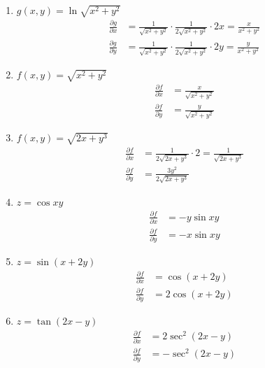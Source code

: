 \begin{enumerate}
    \item $g(x, y)=\ln \sqrt{x^2+y^2}$
          \sol{}
          \begin{align*}
              \frac{\partial g}{\partial x} & = \frac{1}{\sqrt{x^2+y^2}} \cdot \frac{1}{2\sqrt{x^2+y^2}} \cdot 2x =
              \frac{x}{x^2+y^2}                                                                                     \\ \frac{\partial g}{\partial y} & = \frac{1}{\sqrt{x^2+y^2}} \cdot \frac{1}{2\sqrt{x^2+y^2}} \cdot 2y =
                 \frac{y}{x^2+y^2}
          \end{align*}

    \item $f(x, y)=\sqrt{x^2+y^2}$
          \sol{}
          \begin{align*}
              \frac{\partial f}{\partial x} & = \frac{x}{\sqrt{x^2+y^2}} \\ \frac{\partial f}{\partial y} &= \frac{y}{\sqrt{x^2+y^2}}
          \end{align*}

    \item $f(x, y)=\sqrt{2 x+y^3}$
          \sol{}
          \begin{align*}
              \frac{\partial f}{\partial x} & = \frac{1}{2\sqrt{2x+y^3}} \cdot 2 = \frac{1}{\sqrt{2x+y^3}} \\
              \frac{\partial f}{\partial y} & = \frac{3y^2}{2\sqrt{2x+y^3}}
          \end{align*}

    \item $z=\cos x y$
          \sol{}
          \begin{align*}
              \frac{\partial f}{\partial x} & = -y\sin xy \\ \frac{\partial f}{\partial y} &= -x\sin xy
          \end{align*}

    \item $z=\sin (x+2 y)$
          \sol{}
          \begin{align*}
              \frac{\partial f}{\partial x} & = \cos (x+2y) \\ \frac{\partial f}{\partial y} &= 2\cos (x+2y)
          \end{align*}

    \item $z=\tan (2 x-y)$
          \sol{}
          \begin{align*}
              \frac{\partial f}{\partial x} & = 2\sec^2 (2x-y) \\ \frac{\partial f}{\partial y} &= -\sec^2 (2x-y)
          \end{align*}


\end{enumerate}
